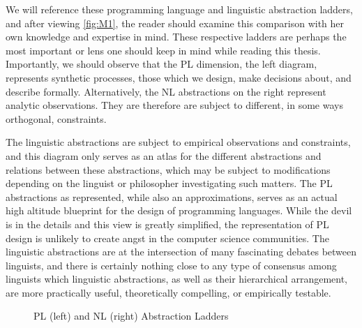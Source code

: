 We will reference these programming language and linguistic abstraction ladders,
and after viewing \autoref{fig:M1}, the reader should examine this
comparison with her own knowledge and expertise in mind. These respective
ladders are perhaps the most important or lens one should keep in mind while
reading this thesis. Importantly, we should observe that the PL dimension, the
left diagram, represents synthetic processes, those which we design, make
decisions about, and describe formally. Alternatively, the NL abstractions on
the right represent analytic observations. They are therefore are subject to
different, in some ways orthogonal, constraints.

The linguistic abstractions are subject to empirical observations and
constraints, and this diagram only serves as an atlas for the different
abstractions and relations between these abstractions, which may be subject to
modifications depending on the linguist or philosopher investigating such
matters. The PL abstractions as represented, while also an approximations,
serves as an actual high altitude blueprint for the design of programming
languages. While the devil is in the details and this view is greatly
simplified, the representation of PL design is unlikely to create angst in the
computer science communities. The linguistic abstractions are at the
intersection of many fascinating debates between linguists, and there is
certainly nothing close to any type of consensus among linguists which
linguistic abstractions, as well as their hierarchical arrangement, are more
practically useful, theoretically compelling, or empirically testable.

\begin{figure}
\centering
{}
\hspace{1cm}
\caption{PL (left) and NL (right) Abstraction Ladders} \label{fig:M1}
\end{figure}


